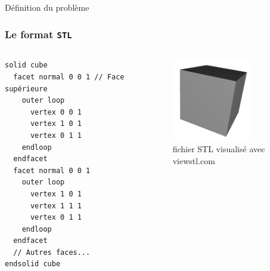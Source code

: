 \begin{frame}{Définition du problème}
\begin{center}
\begin{minipage}{0.45\textwidth}
\end{minipage}
\end{center}
\end{frame}

\begin{frame}[fragile]
  \frametitle{Le format \texttt{STL}}

  \begin{columns}
    \scriptsize
\begin{verbatim}
solid cube
  facet normal 0 0 1 // Face supérieure
    outer loop
      vertex 0 0 1
      vertex 1 0 1
      vertex 0 1 1
    endloop
  endfacet
  facet normal 0 0 1
    outer loop
      vertex 1 0 1
      vertex 1 1 1
      vertex 0 1 1
    endloop
  endfacet
  // Autres faces...
endsolid cube
\end{verbatim}
    \begin{figure}
      \centering
      \includegraphics[width=3.5cm]{capture/cubestl.png} %
      \caption{\tiny fichier STL visualisé avec viewstl.com}
    \end{figure}
  \end{columns}
\end{frame}
